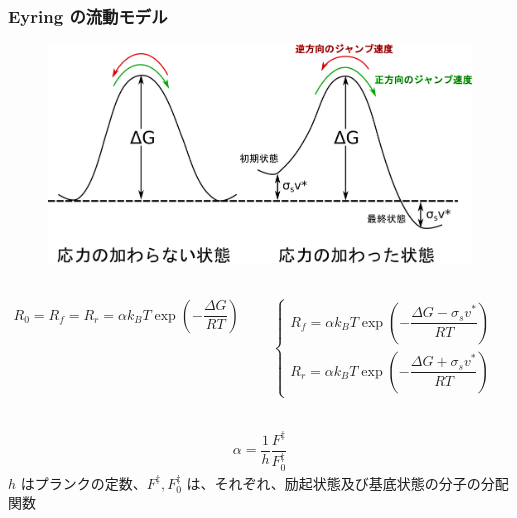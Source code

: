 \documentclass[1４pt, dvipdfmx]{beamer}
\begin{document}

\begin{frame}
\frametitle{Eyring の流動モデル}
    \begin{figure}
    \centering
        \includegraphics[width=.5\textwidth]{flow_under_stress.png}
    \end{figure}
    \footnotesize
    \begin{columns}[totalwidth=.8\textwidth]
            \begin{align*}
            R_0 = R_f = R_r = \alpha k_B T \exp \left( - \dfrac{\Delta G}{RT} \right)
            \end{align*}

            \begin{align*}
            \begin{cases}
            R_f = \alpha k_B T \exp \left( - \dfrac{\Delta G - \sigma_s v^*}{RT} \right)\\[12pt]
            R_r = \alpha k_B T \exp \left( - \dfrac{\Delta G + \sigma_s v^*}{RT} \right)
            \end{cases}
            \end{align*}
	\end{columns}
	
	\begin{align*}
	\alpha = \dfrac{1}{h} \dfrac{F^{\ddag}}{F_0^{\ddag}} 
	\end{align*}
	$h$ はプランクの定数、$F^{\ddag}, F_0^{\ddag}$ は、それぞれ、励起状態及び基底状態の分子の分配関数
\end{frame}
\end{document}
